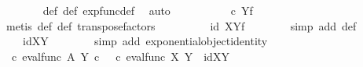 \begin{isabellebody}
\ \ \ \ \ \ \isamarkupfalse%
\ {\isasymphi}{\isacharunderscore}{\kern0pt}def\ {\isasympsi}{\isacharunderscore}{\kern0pt}def\ exp{\isacharunderscore}{\kern0pt}func{\isacharunderscore}{\kern0pt}def{}\ \isamarkupfalse%
\ auto\isanewline
\ \ \ \ \isamarkupfalse%
\ \isamarkupfalse%
\ {\isachardoublequoteopen}{\isachardot}{\kern0pt}{\isachardot}{\kern0pt}{\isachardot}{\kern0pt}\ {\isacharequal}{\kern0pt}\ {\isacharparenleft}{\kern0pt}{\isasympsi}\ {\isasymcirc}\isactrlsub c\ {\isasymphi}{\isacharparenright}{\kern0pt}\isactrlbsup Y\isactrlesup \isactrlsub f{\isachardoublequoteclose}\isanewline
\ \ \ \ \ \ \isamarkupfalse%
\ {\isacharparenleft}{\kern0pt}metis\ {\isasymphi}{\isacharunderscore}{\kern0pt}def\ {\isasympsi}{\isacharunderscore}{\kern0pt}def\ transpose{\isacharunderscore}{\kern0pt}factors{\isacharparenright}{\kern0pt}\isanewline
\ \ \ \ \isamarkupfalse%
\ \isamarkupfalse%
\ {\isachardoublequoteopen}{\isachardot}{\kern0pt}{\isachardot}{\kern0pt}{\isachardot}{\kern0pt}\ {\isacharequal}{\kern0pt}\ {\isacharparenleft}{\kern0pt}id\ X{\isacharparenright}{\kern0pt}\isactrlbsup Y\isactrlesup \isactrlsub f{\isachardoublequoteclose}\isanewline
\ \ \ \ \ \ \isamarkupfalse%
\ {\isacharparenleft}{\kern0pt}simp\ add{\isacharcolon}{\kern0pt}\ {\isasympsi}{\isacharunderscore}{\kern0pt}def{\isacharparenright}{\kern0pt}\isanewline
\ \ \ \ \isamarkupfalse%
\ \isamarkupfalse%
\ {\isachardoublequoteopen}{\isachardot}{\kern0pt}{\isachardot}{\kern0pt}{\isachardot}{\kern0pt}\ \ {\isacharequal}{\kern0pt}\ id{\isacharparenleft}{\kern0pt}X\isactrlbsup Y\isactrlesup {\isacharparenright}{\kern0pt}{\isachardoublequoteclose}\isanewline
\ \ \ \ \ \ \isamarkupfalse%
\ {\isacharparenleft}{\kern0pt}simp\ add{\isacharcolon}{\kern0pt}\ exponential{\isacharunderscore}{\kern0pt}object{\isacharunderscore}{\kern0pt}identity{}{\isacharparenright}{\kern0pt}\isanewline
\ \ \ \ \isamarkupfalse%
\ \isamarkupfalse%
\ {\isachardoublequoteopen}{\isacharparenleft}{\kern0pt}{\isasympsi}\ {\isasymcirc}\isactrlsub c\ eval{\isacharunderscore}{\kern0pt}func\ A\ Y{\isacharparenright}{\kern0pt}\isactrlsup {\isasymsharp}\ {\isasymcirc}\isactrlsub c\ \ {\isacharparenleft}{\kern0pt}{\isasymphi}\ {\isasymcirc}\isactrlsub c\ eval{\isacharunderscore}{\kern0pt}func\ X\ Y{\isacharparenright}{\kern0pt}\isactrlsup {\isasymsharp}\ {\isacharequal}{\kern0pt}\ id{\isacharparenleft}{\kern0pt}X\isactrlbsup Y\isactrlesup {\isacharparenright}{\kern0pt}{\isachardoublequoteclose}\isacommand{{\isachardot}{\kern0pt}}\isamarkupfalse%

\end{isabellebody}
